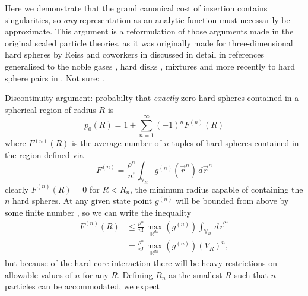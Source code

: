 \documentclass[11pt]{report}
\begin{document}
Here we demonstrate that the grand canonical cost of insertion contains singularities, so \emph{any} representation as an analytic function must necessarily be approximate.
This argument is a reformulation of those arguments made in the original scaled particle theories, as it was originally made for three-dimensional hard spheres by Reiss and coworkers in \cite{Reiss1959,Reiss1960,Mandell1976} discussed in detail in references
generalised to the noble gases \cite{Helfand1960}, hard disks \cite{Helfand1961}, mixtures \cite{Lebowitz1965} and more recently to hard sphere pairs in \cite{Stillinger2006,Chatterjee2006}.
Not sure: \cite{Reiss1961,Frisch1964,Reiss1965,Reiss1974,Tully-Smith1970,Harris1971}.

Discontinuity argument: probabilty that \emph{exactly} zero hard spheres contained in a spherical region of radius $R$ is \cite{Mandell1976}
\begin{equation}\label{eq:spt-zero-cavity-p}
  p_0(R) = 1 + \sum_{n=1}^{\infty} (-1)^n F^{(n)}(R)
\end{equation}
where $F^{(n)}(R)$ is the average number of $n$-tuples of hard spheres contained in the region defined via
\begin{equation}\label{eq:spt-tuple-function}
  F^{(n)} = \frac{\rho^n}{n!} \int_{\mathbb{V}_R} g^{(n)}(\vec{r}^n) \, d\vec{r}^n
\end{equation}
clearly $F^{(n)}(R) = 0$ for $R < R_n$, the minimum radius capable of containing the $n$ hard spheres.
At any given state point $g^{(n)}$ will be bounded from above by some finite number%
,
so we can write the inequality
\begin{equation}\label{eq:spt-tuple-function-upper-bound}
  \begin{split}
    F^{(n)}(R) &\le
    \frac{\rho^n}{n!}
    \max_{\mathbb{R}^{dn}}{\left(g^{(n)}\right)}
    \int_{\mathbb{V}_R} \, d\vec{r}^n \\
    &=
    \frac{\rho^n}{n!}
    \max_{\mathbb{R}^{dn}}{\left(g^{(n)}\right)}
    (V_R)^n,
  \end{split}
\end{equation}
but because of the hard core interaction there will be heavy restrictions on allowable values of $n$ for any $R$.
Defining $R_n$ as the smallest $R$ such that $n$ particles can be accommodated, we expect
\end{document}
